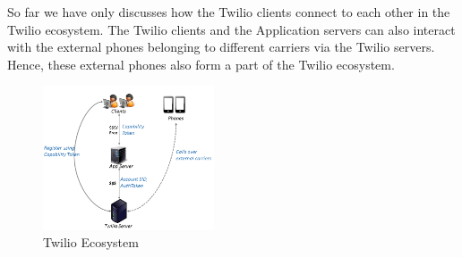 So far we have only discusses how the Twilio clients connect to each other in the Twilio ecosystem. The Twilio clients and the Application servers can also interact with the external phones belonging to different carriers via the Twilio servers. Hence, these external phones also form a part of the Twilio ecosystem.

\begin{figure}
\centering
  \centering
  \includegraphics[width=0.45\textwidth]{figs/Ecosystem.png}
\caption{Twilio Ecosystem}
\label{fig:ecosystem}
\end{figure}     



